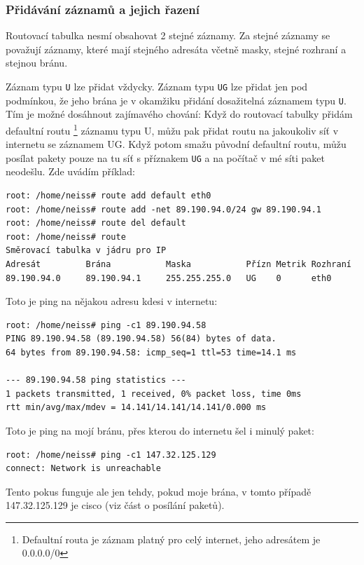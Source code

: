 \subsubsection{Přidávání záznamů a jejich řazení}

Routovací tabulka nesmí obsahovat 2 stejné záznamy. Za stejné záznamy se považují záznamy, které mají stejného adresáta včetně masky, stejné rozhraní a stejnou bránu.

Záznam typu \verb|U| lze přidat vždycky. Záznam typu \verb|UG| lze přidat jen pod podmínkou, že jeho brána je v okamžiku přidání dosažitelná záznamem typu \verb|U|. Tím je možné dosáhnout zajímavého chování: Když do routovací tabulky přidám defaultní routu \footnote{Defaultní routa je záznam platný pro celý internet, jeho adresátem je 0.0.0.0/0} záznamu typu U, můžu pak přidat routu na jakoukoliv síť v internetu se záznamem UG. Když potom smažu původní defaultní routu, můžu posílat pakety pouze na tu síť s příznakem \verb|UG| a na počítač v mé síti paket neodešlu. Zde uvádím příklad:
\begin{verbatim}
root: /home/neiss# route add default eth0
root: /home/neiss# route add -net 89.190.94.0/24 gw 89.190.94.1
root: /home/neiss# route del default
root: /home/neiss# route
Směrovací tabulka v jádru pro IP
Adresát         Brána           Maska           Přízn Metrik Rozhraní
89.190.94.0     89.190.94.1     255.255.255.0   UG    0      eth0
\end{verbatim}
Toto je ping na nějakou adresu kdesi v internetu:
\begin{verbatim}
root: /home/neiss# ping -c1 89.190.94.58
PING 89.190.94.58 (89.190.94.58) 56(84) bytes of data.
64 bytes from 89.190.94.58: icmp_seq=1 ttl=53 time=14.1 ms

--- 89.190.94.58 ping statistics ---
1 packets transmitted, 1 received, 0% packet loss, time 0ms
rtt min/avg/max/mdev = 14.141/14.141/14.141/0.000 ms
\end{verbatim}
Toto je ping na mojí bránu, přes kterou do internetu šel i minulý paket:
\begin{verbatim}
root: /home/neiss# ping -c1 147.32.125.129
connect: Network is unreachable
\end{verbatim}
Tento pokus funguje ale jen tehdy, pokud moje brána, v tomto případě 147.32.125.129 je cisco (viz část o posílání paketů).

